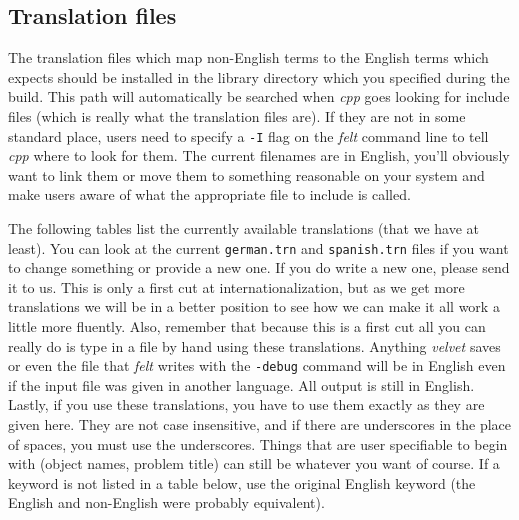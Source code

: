 \begin{appendix}
\section{Translation files}

The translation files which map non-English terms to the English terms
which \felt{} expects should be installed in the library directory which
you specified during the build.  This path will automatically be
searched when {\em cpp} goes looking for include files (which is really
what the translation files are).  If they are not in some standard place,
users need to specify a {\tt -I} flag on the {\em felt} command line to tell
{\em cpp} where to look for them.  The current filenames are in English,
you'll obviously want to link them or move them to something reasonable
on your system and make users aware of what the appropriate file to include
is called.

The following tables list the currently available translations (that we
have at least).  You can look at the current {\tt german.trn} and 
{\tt spanish.trn} files if you want to change something or provide a new
one.  If you do write a new one, please send it to us.  This is only
a first cut at internationalization, but as we get more translations
we will be in a better position to see how we can make it all work a little
more fluently.  Also, remember that because this is a first cut all you
can really do is type in a \felt{} file by hand using these translations.
Anything {\em velvet} saves or even the file that {\em felt} writes with
the {\tt -debug} command will be in English even if the input file was
given in another language.  All output is still in English.  Lastly, if
you use these translations, you have to use them exactly as they are given
here.  They are not case insensitive, and if there are underscores in the
place of spaces, you must use the underscores.  Things that are user 
specifiable to begin with (object names, problem title) can still be 
whatever you want of course.  If a keyword is not listed in a table below,
use the original English keyword (the English and non-English were probably
equivalent).


\end{appendix}
